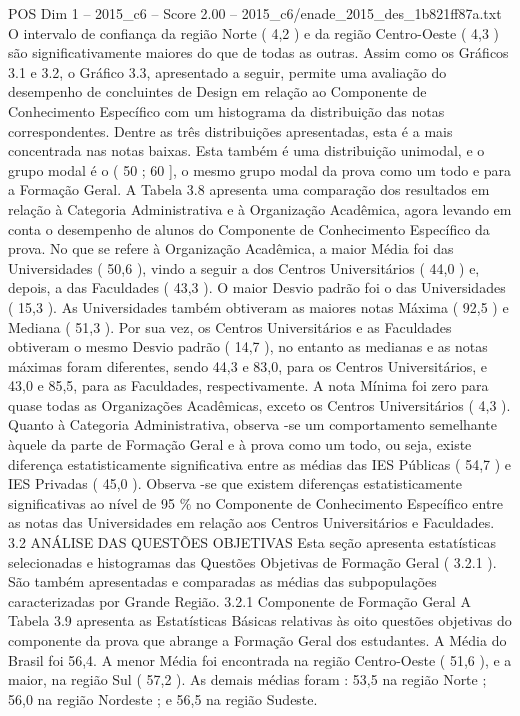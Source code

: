 \begin{textsample}{POS Dim 1 – 2015\_c6 – Score 2.00 – 2015\_c6/enade\_2015\_des\_1b821ff87a.txt}
O intervalo de confiança da região Norte ( 4,2 ) e da região Centro-Oeste ( 4,3 ) são significativamente maiores do que de todas as outras.
Assim como os Gráficos 3.1 e 3.2, o Gráfico 3.3, apresentado a seguir, permite uma avaliação do desempenho de concluintes de Design em relação ao Componente de Conhecimento Específico com um histograma da distribuição das notas correspondentes.
Dentre as três distribuições apresentadas, esta é a mais concentrada nas notas baixas.
Esta também é uma distribuição unimodal, e o grupo modal é o ( 50 ; 60 ], o mesmo grupo modal da prova como um todo e para a Formação Geral.
A Tabela 3.8 apresenta uma comparação dos resultados em relação à Categoria Administrativa e à Organização Acadêmica, agora levando em conta o desempenho de alunos do Componente de Conhecimento Específico da prova.
No que se refere à Organização Acadêmica, a maior Média foi das Universidades ( 50,6 ), vindo a seguir a dos Centros Universitários ( 44,0 ) e, depois, a das Faculdades ( 43,3 ).
O maior Desvio padrão foi o das Universidades ( 15,3 ).
As Universidades também obtiveram as maiores notas Máxima ( 92,5 ) e Mediana ( 51,3 ).
Por sua vez, os Centros Universitários e as Faculdades obtiveram o mesmo Desvio padrão ( 14,7 ), no entanto as medianas e as notas máximas foram diferentes, sendo 44,3 e 83,0, para os Centros Universitários, e 43,0 e 85,5, para as Faculdades, respectivamente.
A nota Mínima foi zero para quase todas as Organizações Acadêmicas, exceto os Centros Universitários ( 4,3 ).
Quanto à Categoria Administrativa, observa -se um comportamento semelhante àquele da parte de Formação Geral e à prova como um todo, ou seja, existe diferença estatisticamente significativa entre as médias das IES Públicas ( 54,7 ) e IES Privadas ( 45,0 ).
Observa -se que existem diferenças estatisticamente significativas ao nível de 95 \% no Componente de Conhecimento Específico entre as notas das Universidades em relação aos Centros Universitários e Faculdades. 3.2 ANÁLISE DAS QUESTÕES OBJETIVAS Esta seção apresenta estatísticas selecionadas e histogramas das Questões Objetivas de Formação Geral ( 3.2.1 ).
São também apresentadas e comparadas as médias das subpopulações caracterizadas por Grande Região. 3.2.1 Componente de Formação Geral A Tabela 3.9 apresenta as Estatísticas Básicas relativas às oito questões objetivas do componente da prova que abrange a Formação Geral dos estudantes.
A Média do Brasil foi 56,4.
A menor Média foi encontrada na região Centro-Oeste ( 51,6 ), e a maior, na região Sul ( 57,2 ).
As demais médias foram : 53,5 na região Norte ; 56,0 na região Nordeste ; e 56,5 na região Sudeste.

\end{textsample}
